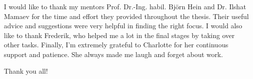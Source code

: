 I would like to thank my mentors Prof. Dr.-Ing. habil. Björn Hein and Dr. Ilshat Mamaev for the time and effort they provided throughout the thesis. Their useful advice and suggestions were very helpful in finding the right focus. I would also like to thank Frederik, who helped me a lot in the final stages by taking over other tasks. Finally, I'm extremely grateful to Charlotte for her continuous support and patience. She always made me laugh and forget about work. 

Thank you all!